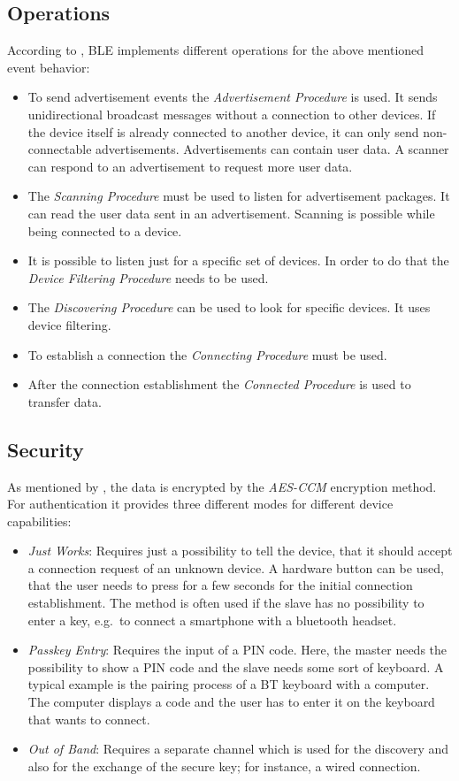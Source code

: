 \subsection*{Operations}
According to \citet{bluetooth:spec}, \ac{BLE} implements different operations for the above mentioned event behavior:
\begin{itemize}
  \item To send advertisement events the \emph{Advertisement Procedure} is used. It sends unidirectional broadcast messages without a connection to other devices. If the device itself is already connected to another device, it can only send non-connectable advertisements. Advertisements can contain user data. A scanner can respond to an advertisement to request more user data.
  \item The \emph{Scanning Procedure} must be used to listen for advertisement packages. It can read the user data sent in an advertisement. Scanning is possible while being connected to a device.
  \item It is possible to listen just for a specific set of devices. In order to do that the \emph{Device Filtering Procedure} needs to be used.
  \item The \emph{Discovering Procedure} can be used to look for specific devices. It  uses device filtering.
  \item To establish a connection the \emph{Connecting Procedure} must be used.
  \item After the connection establishment the \emph{Connected Procedure} is used to transfer data.
\end{itemize}

\subsection*{Security}
As mentioned by \citet{bluetooth:spec}, the data is encrypted by the \emph{AES-CCM} encryption method. For authentication it provides three different modes for different device capabilities:
\begin{itemize}
  \item \emph{Just Works}: Requires just a possibility to tell the device, that it should accept a connection request of an unknown device. A hardware button can be used, that the user needs to press for a few seconds for the initial connection establishment. The method is often used if the slave has no possibility to enter a key, e.g.\ to connect a smartphone with a bluetooth headset.
  \item \emph{Passkey Entry}: Requires the input of a PIN code. Here, the master needs the possibility to show a PIN code and the slave needs some sort of keyboard. A typical example is the pairing process of a \ac{BT} keyboard with a computer. The computer displays a code and the user has to enter it on the keyboard that wants to connect.
  \item \emph{Out of Band}: Requires a separate channel which is used for the discovery and also for the exchange of the secure key; for instance, a wired connection.
\end{itemize}


